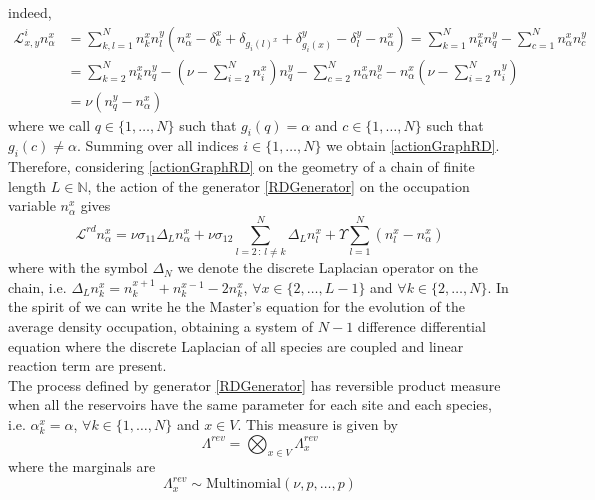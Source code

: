 \documentclass[11pt]{article}
\numberwithin{equation}{section}
\numberwithin{equation}{subsection}
\begin{document}
indeed, 
\begin{equation}
    \begin{split}
\mathcal{L}_{x,y}^{i}n_{\alpha}^{x}&=\sum_{k,l=1}^{N}n_{k}^{x}n_{l}^{y}\left(n_{\alpha}^{x}-\delta_{k}^{x}+\delta_{g_{i}(l)^{x}}+\delta_{g_{i}(x)}^{y}-\delta_{l}^{y}-n_{\alpha}^{x}\right)=\sum_{k=1}^{N}n_{k}^{x}n_{q}^{y}-\sum_{c=1}^{N}n_{\alpha}^{x}n_{c}^{y}
\\&=
\sum_{k=2}^{N}n_{k}^{x}n_{q}^{y}-\left(\nu-\sum_{i=2}^{N}n_{i}^{x}\right)n_{q}^{y}-\sum_{c=2}^{N}n_{\alpha}^{x}n_{c}^{y}-n_{\alpha}^{x}\left(\nu-\sum_{i=2}^{N}n_{i}^{y}\right)
\\&=
\nu(n_{q}^{y}-n_{\alpha}^{x})
    \end{split}
\end{equation}
where we call $q\in \{1,\ldots,N\}$ such that $g_{i}(q)=\alpha$ and $c\in \{1,\ldots,N\}$ such that $g_{i}(c)\neq \alpha$. Summing over all indices $i\in\{1,\ldots,N\}$ we obtain \eqref{actionGraphRD}.\\
Therefore, considering \eqref{actionGraphRD} on the geometry of a chain of finite length $L\in \mathbb{N}$, the action of the generator \eqref{RDGenerator} on the occupation variable $n_{\alpha}^{x}$ gives
\begin{equation}\label{DifferenceEquation}
\mathcal{L}^{rd}n_{\alpha}^{x}=\nu\sigma_{11}\Delta_{L}n_{\alpha}^{x}+\nu\sigma_{12}\sum_{l=2\,:\,l\neq k}^{N}\Delta_{L}n_{l}^{x}+\Upsilon\sum_{l=1}^{N}(n_{l}^{x}-n_{\alpha}^{x})
\end{equation}
where with the symbol $\Delta_{N}$ we denote the discrete Laplacian operator on the chain, i.e. $\Delta_{L}n_{k}^{x}=n_{k}^{x+1}+n_{k}^{x-1}-2n_{k}^{x}$, $\forall x\in \{2,\ldots,L-1\}$ and $\forall k\in \{2,\ldots,N\}$. In the spirit of \cite{casini2022uphill} we can write he the Master's equation for the evolution of the average density occupation, obtaining a system of $N-1$ difference differential equation where the discrete Laplacian of all species are coupled and linear reaction term are present. \\ 
The process defined by generator \eqref{RDGenerator} has reversible product measure when all the reservoirs have the same parameter for each site and each species, i.e. $\alpha_{k}^{x}=\alpha$, $\forall k\in \{1,\ldots,N\}$ and $x\in V$. This measure is given by
\begin{equation}
    \Lambda^{rev}=\bigotimes_{x\in V}\Lambda_{x}^{rev}
\end{equation}
where the marginals are
\begin{equation}
    \Lambda_{x}^{rev}\sim \text{Multinomial}(\nu,p,\ldots,p)
\end{equation}
\end{document}
